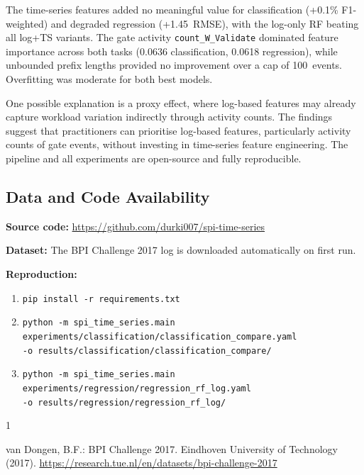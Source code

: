 \documentclass[runningheads]{llncs}
\begin{document}
The time-series features added no meaningful value for classification
(+0.1\% F1-weighted) and degraded regression (+1.45~RMSE), with the
log-only RF beating all log+TS variants. The gate activity
\texttt{count\_W\_Validate} dominated feature importance across both
tasks (0.0636 classification, 0.0618 regression), while unbounded prefix
lengths provided no improvement over a cap of 100~events. Overfitting
was moderate for both best models.

One possible explanation is a proxy effect, where log-based features may
already capture workload variation indirectly through activity counts.
The findings suggest that practitioners can prioritise log-based features,
particularly activity counts of gate events, without investing in
time-series feature engineering. The pipeline and all experiments are
open-source and fully reproducible.

\subsection*{Data and Code Availability}

\textbf{Source code:}
\url{https://github.com/durki007/spi-time-series}

\textbf{Dataset:}
The BPI Challenge 2017 log is downloaded automatically on first run.

\textbf{Reproduction:}
\begin{enumerate}
    \item \texttt{pip install -r requirements.txt}
    \item \texttt{python -m spi\_time\_series.main}\\
          \texttt{experiments/classification/classification\_compare.yaml}\\
          \texttt{-o results/classification/classification\_compare/}
    \item \texttt{python -m spi\_time\_series.main}\\
          \texttt{experiments/regression/regression\_rf\_log.yaml}\\
          \texttt{-o results/regression/regression\_rf\_log/}
\end{enumerate}

\begin{thebibliography}{1}

    van Dongen, B.F.: BPI Challenge 2017. Eindhoven University of Technology
    (2017). \url{https://research.tue.nl/en/datasets/bpi-challenge-2017}

\end{thebibliography}
\appendix
\end{document}

